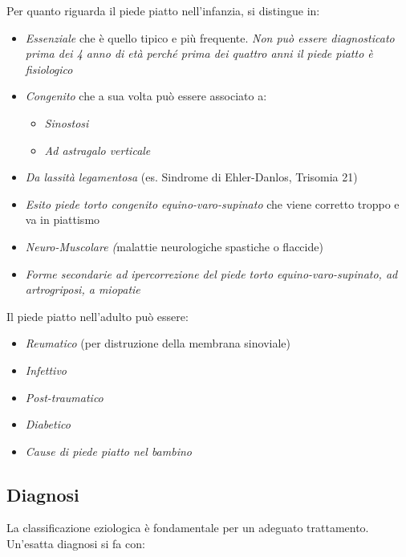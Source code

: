 Per quanto riguarda il piede piatto nell'infanzia, si distingue in:

\begin{itemize}
\item
  \emph{Essenziale} che è quello tipico e più frequente. \emph{Non può essere diagnosticato prima dei 4 anno di età perché prima dei quattro anni il piede piatto è fisiologico}
\item
  \emph{Congenito} che a sua volta può essere associato a:
\begin{itemize}
\item
  \emph{Sinostosi }
\item
  \emph{Ad astragalo verticale }
\end{itemize}
\item
  \emph{Da lassità legamentosa} (es. Sindrome di Ehler-Danlos, Trisomia 21)
\item
  \emph{Esito piede torto congenito equino-varo-supinato} che viene corretto troppo e va in piattismo
\item
  \emph{Neuro-Muscolare (}malattie neurologiche spastiche o flaccide)
\item
  \emph{Forme secondarie ad ipercorrezione del piede torto equino-varo-supinato, ad artrogriposi, a miopatie}
\end{itemize}

Il piede piatto nell'adulto può essere:

\begin{itemize}
\item
  \emph{Reumatico} (per distruzione della membrana sinoviale)
\item
  \emph{Infettivo}
\item
  \emph{Post-traumatico}
\item
  \emph{Diabetico }
\item
  \emph{\emph{Cause di piede piatto nel bambino}}
\end{itemize}

\subsection{Diagnosi}

La classificazione eziologica è fondamentale per un adeguato trattamento. Un'esatta diagnosi si fa con:

